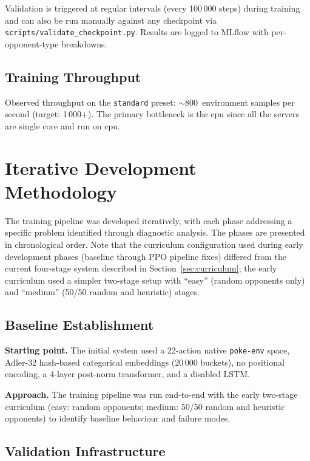 Validation is triggered at regular intervals (every 100\,000 steps) during
training and can also be run manually against any checkpoint via
\texttt{scripts/validate\_checkpoint.py}.  Results are logged to MLflow with
per-opponent-type breakdowns.

\subsection{Training Throughput}

Observed throughput on the \texttt{standard} preset:
$\sim$800~environment samples per second (target: 1\,000+).  The primary
bottleneck is the cpu since all the servers are single core and run on cpu.

\section{Iterative Development Methodology}
\label{sec:dev_methodology}

The training pipeline was developed iteratively, with each phase addressing a
specific problem identified through diagnostic analysis.  The phases are
presented in chronological order.  Note that the curriculum configuration used
during early development phases (baseline through PPO pipeline fixes) differed
from the current four-stage system described in
Section~\ref{sec:curriculum}; the early curriculum used a simpler two-stage
setup with ``easy'' (random opponents only) and ``medium'' (50/50 random and
heuristic) stages.

\subsection{Baseline Establishment}

\textbf{Starting point.} The initial system used a 22-action native
\texttt{poke-env} space, Adler-32 hash-based categorical embeddings (20\,000
buckets), no positional encoding, a 4-layer post-norm transformer, and a
disabled LSTM.

\textbf{Approach.} The training pipeline was run end-to-end with the early
two-stage curriculum (easy: random opponents; medium: 50/50 random and
heuristic opponents) to identify baseline behaviour and failure modes.

\subsection{Validation Infrastructure}

